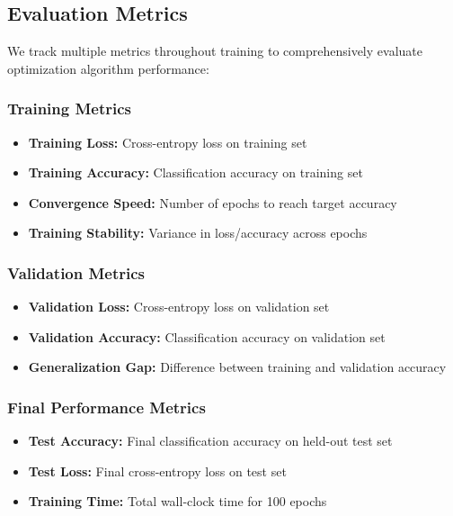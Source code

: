 \documentclass[12pt]{article}
\begin{document}
\subsection{Evaluation Metrics}

We track multiple metrics throughout training to comprehensively evaluate optimization algorithm performance:

\subsubsection{Training Metrics}
\begin{itemize}
    \item \textbf{Training Loss:} Cross-entropy loss on training set
    \item \textbf{Training Accuracy:} Classification accuracy on training set
    \item \textbf{Convergence Speed:} Number of epochs to reach target accuracy
    \item \textbf{Training Stability:} Variance in loss/accuracy across epochs
\end{itemize}

\subsubsection{Validation Metrics}
\begin{itemize}
    \item \textbf{Validation Loss:} Cross-entropy loss on validation set
    \item \textbf{Validation Accuracy:} Classification accuracy on validation set
    \item \textbf{Generalization Gap:} Difference between training and validation accuracy
\end{itemize}

\subsubsection{Final Performance Metrics}
\begin{itemize}
    \item \textbf{Test Accuracy:} Final classification accuracy on held-out test set
    \item \textbf{Test Loss:} Final cross-entropy loss on test set
    \item \textbf{Training Time:} Total wall-clock time for 100 epochs
\end{itemize}
\end{document}

